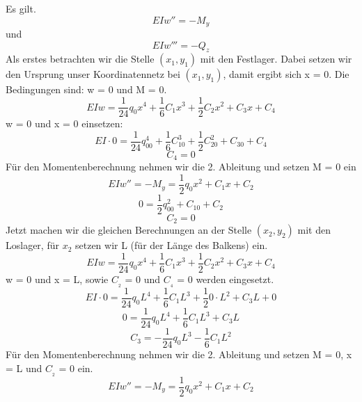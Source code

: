 Es gilt.
\begin{equation}
	EIw'' =
	-M_y
\end{equation}
und
\begin{equation}
	EIw'''=
	-Q_z
\end{equation}
Als erstes betrachten wir die Stelle $(x_1, y_1)$ mit den Festlager.
Dabei setzen wir den Ursprung unser Koordinatennetz bei $(x_1, y_1)$, damit ergibt sich x = 0.
Die Bedingungen sind: w = 0 und M = 0.
\begin{equation}
	EIw=
	\frac{1}{24}q_0x^4+\frac{1}{6}C_1x^3+\frac{1}{2}C_2x^2+C_3x+C_4
\end{equation}
w = 0 und x = 0 einsetzen:
\begin{equation}
	EI\cdot0=
	\frac{1}{24}q_00^4+\frac{1}{6}C_10^3+\frac{1}{2}C_20^2+C_30+C_4
\end{equation}
\begin{equation}
	C_4=
	0
\end{equation}
Für den Momentenberechnung nehmen wir die 2. Ableitung und setzen M = 0 ein
\begin{equation}
	EIw''=
	-M_y=
	\frac{1}{2}q_0x^2+C_1x+C_2
\end{equation}
\begin{equation}
	0=
	\frac{1}{2}q_00^2+C_10+C_2
\end{equation}
\begin{equation}
	C_2=
	0
\end{equation}
Jetzt machen wir die gleichen Berechnungen an der Stelle $(x_2, y_2)$ mit den Loslager, für $x_2$ setzen wir L (für der Länge des Balkens) ein.
\begin{equation}
	EIw=
	\frac{1}{24}q_0x^4+\frac{1}{6}C_1x^3+\frac{1}{2}C_2x^2+C_3x+C_4
\end{equation}
w = 0 und x = L, sowie $C__2$ = 0 und $C__4$ = 0 werden eingesetzt.
\begin{equation}
	EI\cdot0=
	\frac{1}{24}q_0L^4+\frac{1}{6}C_1L^3+\frac{1}{2}0\cdot L^2+C_3L+0
\end{equation}
\begin{equation}
	0=
	\frac{1}{24}q_0L^4+\frac{1}{6}C_1L^3+C_3L
\end{equation}
\begin{equation}
	C_3=
	-\frac{1}{24}q_0L^3-\frac{1}{6}C_1L^2
\end{equation}
Für den Momentenberechnung nehmen wir die 2. Ableitung und setzen M = 0, x = L und $C__2$ = 0 ein.
\begin{equation}
	EIw''=
	-M_y=\frac{1}{2}q_0x^2+C_1x+C_2
\end{equation}
